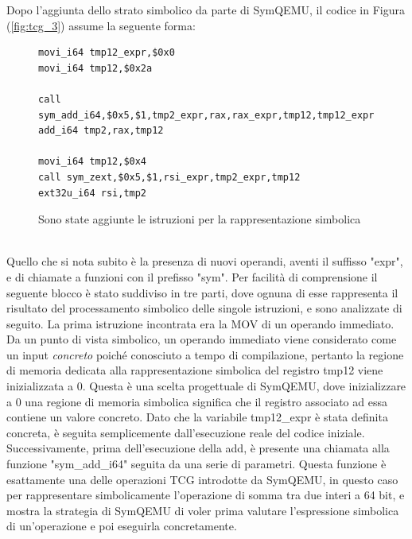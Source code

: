 \documentclass[Lau, oneside]{sapthesis}%
\begin{document}
\newpage
Dopo l'aggiunta dello strato simbolico da parte di SymQEMU, il codice in Figura (\ref{fig:tcg_3}) assume la seguente forma:
\begin{figure}[h]
\begin{lstlisting}[language=SymQEMU, basicstyle=\small]
movi_i64 tmp12_expr,$0x0
movi_i64 tmp12,$0x2a

call sym_add_i64,$0x5,$1,tmp2_expr,rax,rax_expr,tmp12,tmp12_expr
add_i64 tmp2,rax,tmp12

movi_i64 tmp12,$0x4
call sym_zext,$0x5,$1,rsi_expr,tmp2_expr,tmp12
ext32u_i64 rsi,tmp2
\end{lstlisting}
\caption{Sono state aggiunte le istruzioni per la rappresentazione simbolica}
\label{fig:tcg_4}
\end{figure}
\ \\
Quello che si nota subito è la presenza di nuovi operandi, aventi il suffisso "expr", e di chiamate a funzioni con il prefisso "sym".
\newline \newline
Per facilità di comprensione il seguente blocco è stato suddiviso in tre parti, dove ognuna di esse rappresenta il risultato del processamento simbolico delle singole istruzioni, e sono analizzate di seguito.
\newline \newline
La prima istruzione incontrata era la MOV di un operando immediato.
\newline
Da un punto di vista simbolico, un operando immediato viene considerato come un input \textit{concreto} poiché conosciuto a tempo di compilazione, pertanto la regione di memoria dedicata alla rappresentazione simbolica del registro tmp12 viene inizializzata a 0.
\newline
Questa è una scelta progettuale di SymQEMU, dove inizializzare a 0 una regione di memoria simbolica significa che il registro associato ad essa contiene un valore concreto.
\newline
Dato che la variabile tmp12\_expr è stata definita concreta, è seguita semplicemente dall'esecuzione reale del codice iniziale.
\newline \newline
Successivamente, prima dell'esecuzione della add, è presente una chiamata alla funzione "sym\_add\_i64" seguita da una serie di parametri.
\newline
Questa funzione è esattamente una delle operazioni TCG introdotte da SymQEMU, in questo caso per rappresentare simbolicamente l'operazione di somma tra due interi a 64 bit, e mostra la strategia di SymQEMU di voler prima valutare l'espressione simbolica di un'operazione e poi eseguirla concretamente.
\end{document}
